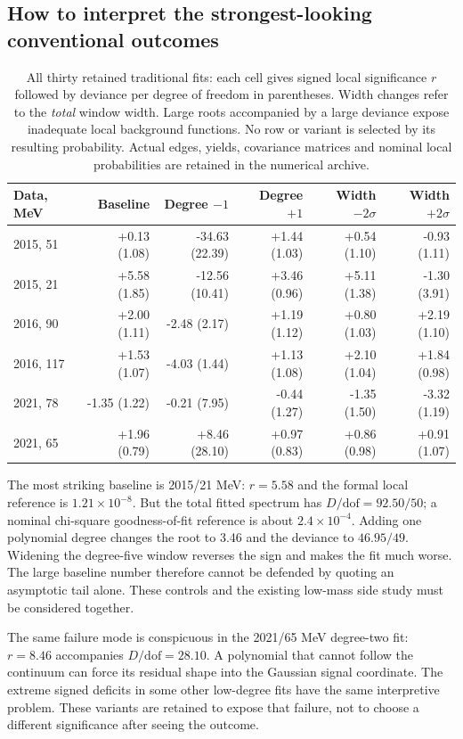 \clearpage
\subsection{How to interpret the strongest-looking conventional outcomes}
\begin{table}[H]
\centering\small
\begin{tabular}{lrrrrr}
\toprule
Data, MeV & Baseline & Degree $-1$ & Degree $+1$ & Width $-2\sigma$ & Width $+2\sigma$ \\
\midrule
2015, 51 & +0.13 (1.08) & -34.63 (22.39) & +1.44 (1.03) & +0.54 (1.10) & -0.93 (1.11) \\
2015, 21 & +5.58 (1.85) & -12.56 (10.41) & +3.46 (0.96) & +5.11 (1.38) & -1.30 (3.91) \\
2016, 90 & +2.00 (1.11) & -2.48 (2.17) & +1.19 (1.12) & +0.80 (1.03) & +2.19 (1.10) \\
2016, 117 & +1.53 (1.07) & -4.03 (1.44) & +1.13 (1.08) & +2.10 (1.04) & +1.84 (0.98) \\
2021, 78 & -1.35 (1.22) & -0.21 (7.95) & -0.44 (1.27) & -1.35 (1.50) & -3.32 (1.19) \\
2021, 65 & +1.96 (0.79) & +8.46 (28.10) & +0.97 (0.83) & +0.86 (0.98) & +0.91 (1.07) \\
\bottomrule
\end{tabular}
\caption{All thirty retained traditional fits: each cell gives signed local significance $r$ followed by deviance per degree of freedom in parentheses. Width changes refer to the \emph{total} window width. Large roots accompanied by a large deviance expose inadequate local background functions. No row or variant is selected by its resulting probability. Actual edges, yields, covariance matrices and nominal local probabilities are retained in the numerical archive.}\label{tab:traditional-all}
\end{table}

The most striking baseline is 2015/21 MeV: $r=5.58$ and the formal local reference is $1.21\times10^{-8}$. But the total fitted spectrum has $D/\mathrm{dof}=92.50/50$; a nominal chi-square goodness-of-fit reference is about $2.4\times10^{-4}$. Adding one polynomial degree changes the root to 3.46 and the deviance to $46.95/49$. Widening the degree-five window reverses the sign and makes the fit much worse. The large baseline number therefore cannot be defended by quoting an asymptotic tail alone. These controls and the existing low-mass side study must be considered together.

The same failure mode is conspicuous in the 2021/65 MeV degree-two fit: $r=8.46$ accompanies $D/\mathrm{dof}=28.10$. A polynomial that cannot follow the continuum can force its residual shape into the Gaussian signal coordinate. The extreme signed deficits in some other low-degree fits have the same interpretive problem. These variants are retained to expose that failure, not to choose a different significance after seeing the outcome.

